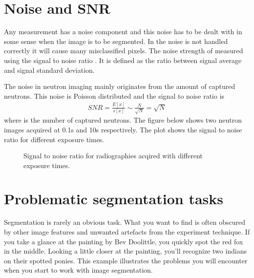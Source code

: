 \documentclass[letterpaper,10pt,english]{sphinxmanual}
\begin{document}
\noindent{}


\section{Noise and SNR}
\label{\detokenize{ML4NeutronImageSegmentation:noise-and-snr}}
Any measurement has a noise component and this noise has to be dealt with in some sense when the image is to be segmented. In the noise is not handled correctly it will cause many misclassified pixels. The noise strength of measured using the signal to noise ratio . It is defined as the ratio between signal average and signal standard deviation.

The noise in neutron imaging mainly originates from the amount of captured neutrons. This noise is Poisson distributed and the signal to noise ratio is
\begin{equation*}
\begin{split}SNR=\frac{E[x]}{s[x]}\sim\frac{N}{\sqrt{N}}=\sqrt{N}\end{split}
\end{equation*}
where  is the number of captured neutrons. The figure below shows two neutron images acquired at 0.1s and 10s respectively. The plot shows the signal to noise ratio for different exposure times.

\begin{figure}[htbp]
\centering
\capstart

\noindent{}
\caption{Signal to noise ratio for radiographies acqired with different exposure times.}\label{\detokenize{ML4NeutronImageSegmentation:id8}}\end{figure}




\section{Problematic segmentation tasks}
\label{\detokenize{ML4NeutronImageSegmentation:problematic-segmentation-tasks}}
Segmentation is rarely an obvious task. What you want to find is often obscured by other image features and unwanted artefacts from the experiment technique. If you take a glance at the painting by Bev Doolittle, you quickly spot the red fox in the middle. Looking a little closer at the painting, you’ll recognize two indians on their spotted ponies. This example illustrates the problems you will encounter when you start to work with image segmentation.
\end{document}
